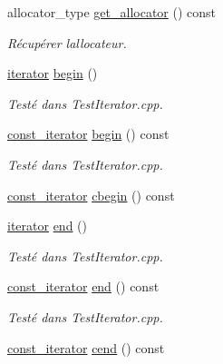 \begin{DoxyCompactItemize}
allocator\+\_\+type \hyperlink{classMultimap_a9c10ccfcca7dd81119454f0f1f9e7b06}{get\+\_\+allocator} () const
\begin{DoxyCompactList}\small\item\em Récupérer l\textquotesingle{}allocateur. \end{DoxyCompactList}\item 
\mbox{\label{classMultimap_a4dd20f4e80f4a06be0c0fb693dd6f422}} 
\hyperlink{classMultimapIterator}{iterator} \hyperlink{classMultimap_a4dd20f4e80f4a06be0c0fb693dd6f422}{begin} ()
\begin{DoxyCompactList}\small\item\em Testé dans Test\+Iterator.\+cpp. \end{DoxyCompactList}\item 
\mbox{\label{classMultimap_aa5e3a708e644da57ac887e1acddec409}} 
\hyperlink{classMultimapIterator}{const\+\_\+iterator} \hyperlink{classMultimap_aa5e3a708e644da57ac887e1acddec409}{begin} () const
\begin{DoxyCompactList}\small\item\em Testé dans Test\+Iterator.\+cpp. \end{DoxyCompactList}\item 
\hyperlink{classMultimapIterator}{const\+\_\+iterator} \hyperlink{classMultimap_a216f03259a422977ea001d281a810248}{cbegin} () const
\item 
\mbox{\label{classMultimap_a9951e49f57fe1c3984d78543eb2d9041}} 
\hyperlink{classMultimapIterator}{iterator} \hyperlink{classMultimap_a9951e49f57fe1c3984d78543eb2d9041}{end} ()
\begin{DoxyCompactList}\small\item\em Testé dans Test\+Iterator.\+cpp. \end{DoxyCompactList}\item 
\mbox{\label{classMultimap_aee637556495f8eacebf27e95e4b9bbf6}} 
\hyperlink{classMultimapIterator}{const\+\_\+iterator} \hyperlink{classMultimap_aee637556495f8eacebf27e95e4b9bbf6}{end} () const
\begin{DoxyCompactList}\small\item\em Testé dans Test\+Iterator.\+cpp. \end{DoxyCompactList}\item 
\hyperlink{classMultimapIterator}{const\+\_\+iterator} \hyperlink{classMultimap_a7e162ec76d003b3f888c8859a9b6ca03}{cend} () const

\end{DoxyCompactItemize}
